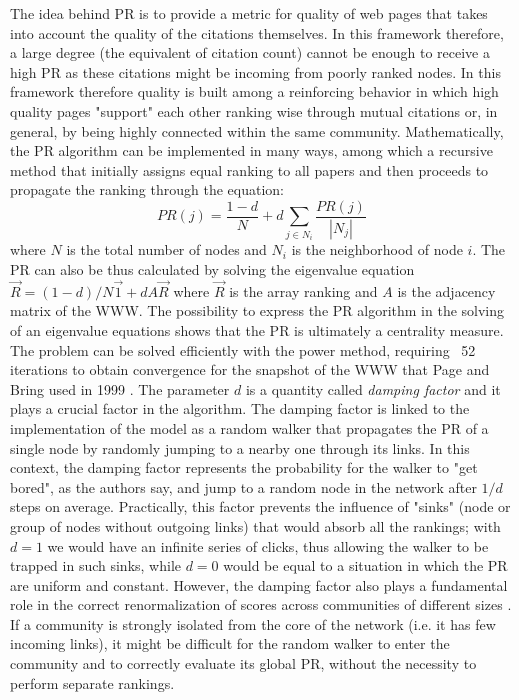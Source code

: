 The idea behind PR is to provide a metric for quality of web pages that takes into account the quality of the citations 
 themselves. In this framework therefore, a large degree (the equivalent of citation count) cannot be enough to receive a high PR as these citations
 might be incoming from poorly ranked nodes. In this framework therefore quality is built among a reinforcing behavior in which high quality pages
 "support" each other ranking wise through mutual citations or, in general, by being highly connected within the same community. Mathematically, the PR
 algorithm can be implemented in many ways, among which a recursive method that initially assigns equal ranking to all papers and then proceeds
 to propagate the ranking through the equation:
 \begin{equation} \label{eq:PR}
 PR(j) = \frac{1 -d }{N} + d \sum_{j \in N_{i}} \frac{PR(j)}{|N_{j}|} 
 \end{equation}
 where $N$ is the total number of nodes and $N_{i}$ is the neighborhood of node $i$. The PR can also be thus calculated by solving the eigenvalue equation $\vec{R} =  (1 -d)/N \vec{1} + d A\vec{R}$ where $\vec{R}$ is the array ranking and $A$ is the adjacency matrix of the WWW. The possibility 
 to express the PR algorithm in the solving of an eigenvalue equations shows that the PR is ultimately a centrality measure. The problem can be solved efficiently with the power method, requiring ~52 iterations to obtain convergence for the 
snapshot of the WWW that Page and Bring used in 1999 \cite{Page99thepagerank}.
The parameter $d$ is a quantity called \textit{damping factor} and it plays a crucial factor in the algorithm. The damping factor is linked to the
implementation of the model as a random walker that propagates the PR of a single node by randomly jumping
  to a nearby one through its links. In this context, the damping factor represents the probability for the walker to "get bored", as the authors say, and jump to a random
 node in the network after $1/d$ steps on average. Practically, this factor prevents the influence of "sinks" (node or group of nodes without outgoing links) that would absorb all 
 the rankings; with
 $d = 1$ we would have an infinite series of clicks, thus allowing the walker to be trapped in such sinks, while $d=0$ would be equal to a situation
 in which the PR are uniform and constant. However, the damping factor also plays a fundamental role in the correct renormalization of scores across communities
 of different sizes  \cite{Xie2007}. If a community is strongly isolated from the core of the network (i.e. it has few incoming links), it might be difficult
 for the random walker to enter the community and to correctly evaluate its global PR, without the necessity to perform separate rankings.
 
